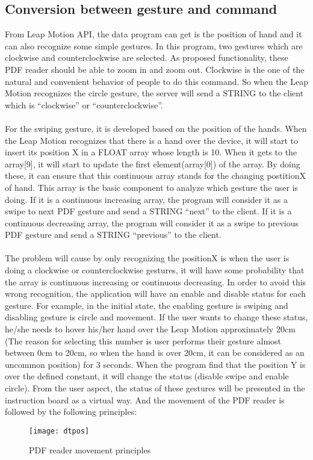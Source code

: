\subsection{Conversion between gesture and command}
From Leap Motion API, the data program can get is the position of hand and it can also recognize some simple gestures. In this program, two gestures which are clockwise and counterclockwise are selected. As proposed functionality, these PDF reader should be able to zoom in and zoom out. Clockwise is the one of the natural and convenient behavior of people to do this command. So when the Leap Motion recognizes the circle gesture, the server will send a STRING to the client which is “clockwise” or “counterclockwise”. 
\\
\\
For the swiping gesture, it is developed based on the position of the hands. When the Leap Motion recognizes that there is a hand over the device, it will start to insert its position X in a FLOAT array whose length is 10. When it gets to the array[9], it will start to update the first element(array[0]) of the array. By doing these, it can ensure that this continuous array stands for the changing postitionX of hand. This array is the basic component to analyze which gesture the user is doing. If it is a continuous increasing array, the program will consider it as a swipe to next PDF gesture and send a STRING “next” to the client. If it is a continuous decreasing array, the program will consider it as a swipe to previous PDF gesture and send a STRING “previous” to the client. 
\\
\\
The problem will cause by only recognizing the positionX is when the user is doing a clockwise or counterclockwise gestures, it will have some probability that the array is continuous increasing or continuous decreasing. In order to avoid this wrong recognition, the application will have an enable and disable status for each gesture. For example, in the initial state, the enabling gesture is swiping and disabling gesture is circle and movement. If the user wants to change these status, he/she needs to hover his/her hand over the Leap Motion approximately 20cm (The reason for selecting this number is user performs their gesture almost between 0cm to 20cm, so when the hand is over 20cm, it can be considered as an uncommon position) for 3 seconds. When the program find that the position Y is over the defined constant, it will change the status (disable swipe and enable circle). From the user aspect, the status of these gestures will be presented in the instruction board as a virtual way. And the movement of the PDF reader is followed by the following principles:
\begin{figure}[h]
    \centering
	\texttt{[image: dtpos]}
    \caption{PDF reader movement principles}
    \label{fig:mesh1}
\end{figure}



